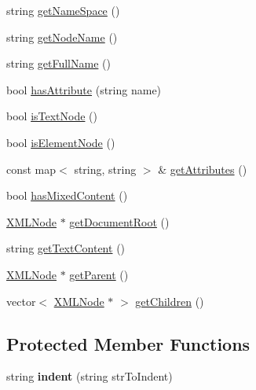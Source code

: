 \begin{DoxyCompactItemize}
\item 
string \hyperlink{class_x_m_l_node_af5d4018320b4fd202409546e3e2d3347}{get\-Name\-Space} ()
\item 
string \hyperlink{class_x_m_l_node_ab83c7475e30e92fca4813592fe00e353}{get\-Node\-Name} ()
\item 
string \hyperlink{class_x_m_l_node_ae19a3896b76d3c9f2df6038a7c64bf27}{get\-Full\-Name} ()
\item 
bool \hyperlink{class_x_m_l_node_a9064f0388a5386f4b0ab5fbba4114f3e}{has\-Attribute} (string name)
\item 
bool \hyperlink{class_x_m_l_node_aca2a516ac15814517653cc161d57a300}{is\-Text\-Node} ()
\item 
bool \hyperlink{class_x_m_l_node_a8b228feaecb6906791035f6a003167f7}{is\-Element\-Node} ()
\item 
const map$<$ string, string $>$ \& \hyperlink{class_x_m_l_node_a80ae04b136774fa6cd9075fa92148965}{get\-Attributes} ()
\item 
bool \hyperlink{class_x_m_l_node_ac58a39b3a9eb5f67b781b760f2883e88}{has\-Mixed\-Content} ()
\item 
\hyperlink{class_x_m_l_node}{\-X\-M\-L\-Node} $\ast$ \hyperlink{class_x_m_l_node_aca5e607598ba590d941f5140dde1c089}{get\-Document\-Root} ()
\item 
string \hyperlink{class_x_m_l_node_a320fd7d6ef15b2274352abff2a592397}{get\-Text\-Content} ()
\item 
\hyperlink{class_x_m_l_node}{\-X\-M\-L\-Node} $\ast$ \hyperlink{class_x_m_l_node_ab53132738607b90b12146a8f850fbc9c}{get\-Parent} ()
\item 
vector$<$ \hyperlink{class_x_m_l_node}{\-X\-M\-L\-Node} $\ast$ $>$ \hyperlink{class_x_m_l_node_a1f4ea630819d007ddc5df02f331a1dcb}{get\-Children} ()
\end{DoxyCompactItemize}
\subsection*{\-Protected \-Member \-Functions}
\begin{DoxyCompactItemize}
\item 
\hypertarget{class_x_m_l_node_a770b413a95ae2efc8a56fa4eed3e000e}{string {\bfseries indent} (string str\-To\-Indent)}\label{class_x_m_l_node_a770b413a95ae2efc8a56fa4eed3e000e}

\end{DoxyCompactItemize}
